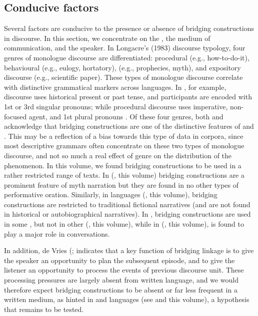 \documentclass[output=paper]{LSP/langsci}
\begin{document}
\subsection{Conducive factors} 
\label{GuAi41conducive}
Several factors are conducive to the presence or absence of bridging constructions in discourse. In this section, we concentrate on the , the medium of communication, and the speaker. 
In Longacre’s (1983) discourse typology, four genres of monologue discourse are differentiated: procedural (e.g., how-to-do-it), behavioural (e.g., eulogy, hortatory),  (e.g., prophecies, myth), and expository discourse (e.g., scientific paper). These types of monologue discourse correlate with distinctive grammatical markers across languages. In , for example,  discourse uses historical present or past tense, and participants are encoded with 1st or 3rd singular pronouns; while procedural discourse uses imperative, non-focused agent, and 1st plural pronouns \citep[][3--17]{longacre83}. Of these four genres, both \citet[][9]{longacre83} and \citet[][365]{devries.2005} acknowledge that bridging constructions are one of the distinctive features of  and . This may be a reflection of a bias towards this type of data in corpora, since most descriptive grammars often concentrate on these two types of monologue discourse, and not so much a real effect of genre on the distribution of the phenomenon. In this volume, we found bridging constructions to be used in a rather restricted range of texts. In  (\citeauthor{emlen18}, this volume) bridging constructions are a prominent feature of myth narration but they are found in no other types of performative oration. Similarly, in  languages (\citeauthor{anker18}, this volume), bridging constructions are restricted to traditional fictional narratives (and are not found in historical or autobiographical narratives). In , bridging constructions are used in some , but not in other  (\citeauthor{sarvasy18}, this volume), while in  (\citeauthor{alvanoudi18}, this volume),  is found to play a major  role in conversations. 

In addition, de Vries (\citeyear[][378]{devries.2005};\citeyear[][817]{devries.2006} indicates that a key function of bridging linkage is to give the speaker an opportunity to plan the subsequent  episode, and to give the listener an opportunity to process the events of previous discourse unit.  These processing pressures are largely absent from written language, and we would therefore expect bridging constructions to be absent or far less frequent in a written medium, as hinted in  and  languages (see \citeauthor{emlen18} and \citeauthor{anker18} this volume), a hypothesis that remains to be tested.
\end{document}
